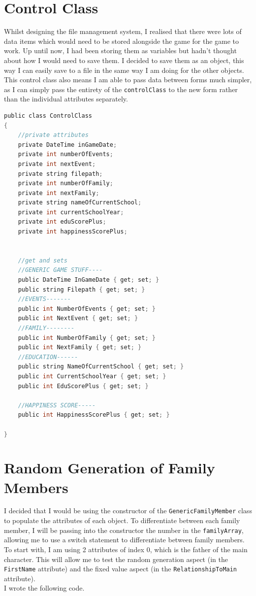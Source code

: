 \section{Control Class}
Whilst designing the file management system, I realised that there were lots of data items which would need to be stored alongside the game for the game to work. Up until now, I had been storing them as variables but hadn't thought about how I would need to save them. I decided to save them as an object, this way I can easily save to a file in the same way I am doing for the other objects.
This control class also means I am able to pass data between forms much simpler, as I can simply pass the entirety of the \verb|controlClass| to the new form rather than the individual attributes separately.
\begin{lstlisting}[language=c, style=csharp, caption=Declaration of Control Class]
public class ControlClass
{
    //private attributes
    private DateTime inGameDate;
    private int numberOfEvents;
    private int nextEvent;
    private string filepath;
    private int numberOfFamily;
    private int nextFamily;
    private string nameOfCurrentSchool;
    private int currentSchoolYear;
    private int eduScorePlus;
    private int happinessScorePlus;


    //get and sets
    //GENERIC GAME STUFF----
    public DateTime InGameDate { get; set; }
    public string Filepath { get; set; }
    //EVENTS-------
    public int NumberOfEvents { get; set; }
    public int NextEvent { get; set; }
    //FAMILY--------
    public int NumberOfFamily { get; set; }
    public int NextFamily { get; set; }
    //EDUCATION------
    public string NameOfCurrentSchool { get; set; }
    public int CurrentSchoolYear { get; set; }
    public int EduScorePlus { get; set; }

    //HAPPINESS SCORE-----
    public int HappinessScorePlus { get; set; }

}
\end{lstlisting}

\section{Random Generation of Family Members}
I decided that I would be using the constructor of the \verb|GenericFamilyMember| class to populate the attributes of each object. To differentiate between each family member, I will be passing into the constructor the number in the \verb|familyArray|, allowing me to use a switch statement to differentiate between family members.\\
To start with, I am using 2 attributes of index 0, which is the father of the main character. This will allow me to test the random generation aspect (in the \verb|FirstName| attribute) and the fixed value aspect (in the \verb|RelationshipToMain| attribute).\\
I wrote the following code.

